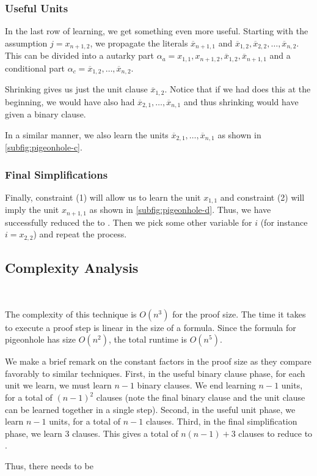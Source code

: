 \subsubsection{Useful Units} In the last row of learning, we get something even more useful. Starting with the assumption $j = x_{n+1, 2}$, we propagate the literals $\overline{x}_{n + 1, 1}$ and $\overline{x}_{1, 2}, \overline{x}_{2, 2}, \ldots, \overline{x}_{n, 2}$.  This can be divided into a autarky part $\alpha_a = x_{1, 1}, x_{n+1, 2}, \overline{x}_{1, 2}, \overline{x}_{n+1, 1}$ and a conditional part $\alpha_c = \overline{x}_{1, 2}, \ldots, \overline{x}_{n, 2}$.

Shrinking gives us just the unit clause $\overline{x}_{1, 2}$. Notice that if we had does this at the beginning, we would have also had $\overline{x}_{2, 1}, \ldots, \overline{x}_{n, 1}$ and thus shrinking would have given a binary clause.

In a similar manner, we also learn the units $\overline{x}_{2, 1}, \ldots, \overline{x}_{n, 1}$ as shown in \autoref{subfig:pigeonhole-c}.

\subsubsection{Final Simplifications} Finally, constraint (1) will allow us to learn the unit $x_{1, 1}$ and constraint (2) will imply the unit $x_{n+1, 1}$ as shown in \autoref{subfig:pigeonhole-d}. Thus, we have successfully reduced the  to . Then we pick some other variable for $i$ (for instance $i = x_{2, 2}$) and repeat the process.

\subsection{Complexity Analysis}~\label{subsec:complexity analysis}

The complexity of this technique is $O(n^3)$ for the proof size. The time it takes to execute a proof step is linear in the size of a formula. Since the formula for pigeonhole has size $O(n^2)$, the total runtime is $O(n^5)$.

We make a brief remark on the constant factors in the proof size as they compare favorably to similar techniques. First, in the useful binary clause phase, for each unit we learn, we must learn $n-1$ binary clauses. We end learning $n-1$ units, for a total of $(n-1)^2$ clauses (note the final binary clause and the unit clause can be learned together in a single step). Second, in the useful unit phase, we learn $n-1$ units, for a total of $n-1$ clauses. Third, in the final simplification phase, we learn 3 clauses. This gives a total of $n(n-1) + 3$ clauses to reduce  to .

Thus, there needs to be 